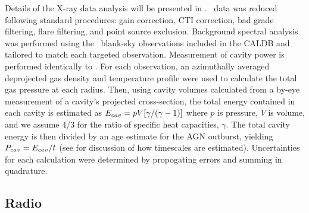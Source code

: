 \documentclass{emulateapj}
\begin{document}

Details of the X-ray data analysis will be presented in
\citet{nulsen09}. \chandra\ data was reduced following standard
procedures: gain correction, CTI correction, bad grade filtering,
flare filtering, and point source exclusion. Background spectral
analysis was performed using the \caldb\ blank-sky observations
included in the CALDB and tailored to match each targeted observation.
Measurement of cavity power is performed identically to
\citet{rafferty06}. For each observation, an azimuthally averaged
deprojected gas density and temperature profile were used to calculate
the total gas pressure at each radius. Then, using cavity volumes
calculated from a by-eye measurement of a cavity's projected
cross-section, the total energy contained in each cavity is estimated
as $E_{cav} = pV[\gamma/(\gamma-1)]$ where $p$ is pressure, $V$ is
volume, and we assume 4/3 for the ratio of specific heat capacities,
$\gamma$. The total cavity energy is then divided by an age estimate
for the AGN outburst, yielding $P_{cav} = E_{cav}/t$ (see \citet{mcnamrev}
for discussion of how timescales are estimated). Uncertainties for
each calculation were determined by propogating errors and summing in
quadrature.

\subsection{Radio}
\label{sec:radio}

\end{document}
